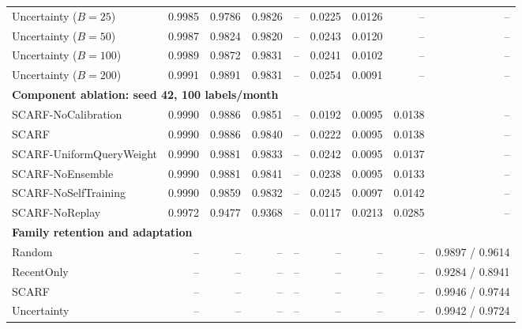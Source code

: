 \begin{tabular}{lrrrrrrrr}
Uncertainty ($B=25$) & 0.9985 & 0.9786 & 0.9826 & -- & 0.0225 & 0.0126 & -- & -- \\
Uncertainty ($B=50$) & 0.9987 & 0.9824 & 0.9820 & -- & 0.0243 & 0.0120 & -- & -- \\
Uncertainty ($B=100$) & 0.9989 & 0.9872 & 0.9831 & -- & 0.0241 & 0.0102 & -- & -- \\
Uncertainty ($B=200$) & 0.9991 & 0.9891 & 0.9831 & -- & 0.0254 & 0.0091 & -- & -- \\
\midrule
\multicolumn{9}{l}{\textbf{Component ablation: seed 42, 100 labels/month}} \\
SCARF-NoCalibration & 0.9990 & 0.9886 & 0.9851 & -- & 0.0192 & 0.0095 & 0.0138 & -- \\
SCARF & 0.9990 & 0.9886 & 0.9840 & -- & 0.0222 & 0.0095 & 0.0138 & -- \\
SCARF-UniformQueryWeight & 0.9990 & 0.9881 & 0.9833 & -- & 0.0242 & 0.0095 & 0.0137 & -- \\
SCARF-NoEnsemble & 0.9990 & 0.9881 & 0.9841 & -- & 0.0238 & 0.0095 & 0.0133 & -- \\
SCARF-NoSelfTraining & 0.9990 & 0.9859 & 0.9832 & -- & 0.0245 & 0.0097 & 0.0142 & -- \\
SCARF-NoReplay & 0.9972 & 0.9477 & 0.9368 & -- & 0.0117 & 0.0213 & 0.0285 & -- \\
\midrule
\multicolumn{9}{l}{\textbf{Family retention and adaptation}} \\
Random & -- & -- & -- & -- & -- & -- & -- & 0.9897 / 0.9614 \\
RecentOnly & -- & -- & -- & -- & -- & -- & -- & 0.9284 / 0.8941 \\
SCARF & -- & -- & -- & -- & -- & -- & -- & 0.9946 / 0.9744 \\
Uncertainty & -- & -- & -- & -- & -- & -- & -- & 0.9942 / 0.9724 \\
\bottomrule
\end{tabular}
